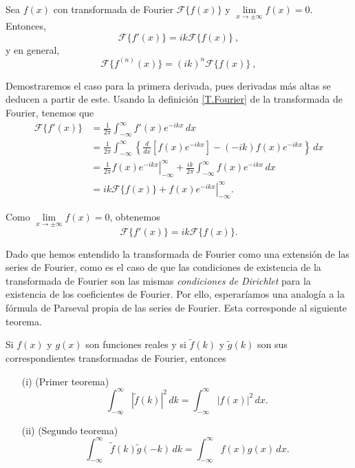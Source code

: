 \begin{propo}
Sea $f(x)$ con transformada de Fourier $\mathcal{F}\{f(x)\}$ y $\lim\limits_{x \to \pm \infty} f(x) = 0$. Entonces, 
\begin{equation}
    \boxed{\mathcal{F}\{f'(x)\} = i k \mathcal{F}\{f(x)\}\ ,} 
\end{equation}
y en general, 
\begin{equation}
    \mathcal{F}\{f^{(n)} (x)\} = (i k)^n \mathcal{F}\{f(x)\} \ ,
\end{equation}
\end{propo}

\begin{demo}
Demostraremos el caso para la primera derivada, pues derivadas más altas se deducen a partir de este. Usando la definición \eqref{T.Fourier} de la transformada de Fourier, tenemos que 
\begin{align*}
    \mathcal{F}\{f'(x)\} &= \frac{1}{2\pi} \int_{- \infty}^{\infty} f'(x) e^{-ikx} \,dx \\
    &= \frac{1}{2\pi} \int_{- \infty}^{\infty} \left\{ \frac{d}{dx}\left[ f(x) e^{-ikx} \right]  - (-ik) f(x) e^{-ikx} \right\}\,dx \\
    &= \frac{1}{2\pi} \left. f(x) e^{-ikx} \right|_{-\infty}^{\infty} + \frac{ik}{2\pi} \int_{- \infty}^{\infty}  f(x) e^{-ikx} \,dx \\
    &=  ik \mathcal{F}\{f(x)\} + \left. f(x) e^{-ikx} \right|_{-\infty}^{\infty}.
\end{align*}

Como  $\lim\limits_{x \to \pm \infty} f(x) = 0$, obtenemos
$$\mathcal{F}\{f'(x)\} = i k \mathcal{F}\{f(x)\}.$$
\end{demo}



Dado que hemos entendido la transformada de Fourier como una extensión de las series de Fourier, como es el caso de que las condiciones de existencia de la transformada de Fourier son las mismas \emph{condiciones de Dirichlet} para la existencia de los coeficientes de Fourier. Por ello, esperaríamos una analogía a la fórmula de Parseval propia de las series de Fourier. Esta corresponde al siguiente teorema.

\begin{teorema}[de Parseval]
Si $f(x)$ y $g(x)$ son funciones reales y si $\tilde{f}(k)$ y $\tilde{g}(k)$ son sus correspondientes transformadas de Fourier, entonces

\begin{itemize}
    \item[(i)] (Primer teorema)
    $$\int_{-\infty}^{\infty} |\tilde{f}(k)|^2\, dk = \int_{-\infty}^{\infty} |f(x)|^2 \, dx. $$
    
    \item[(ii)] (Segundo teorema)
    $$\int_{-\infty}^{\infty} \tilde{f}(k) \tilde{g}(-k) \, dk = \int_{-\infty}^{\infty} f(x) g(x) \, dx. $$
    
\end{itemize}
\end{teorema}

